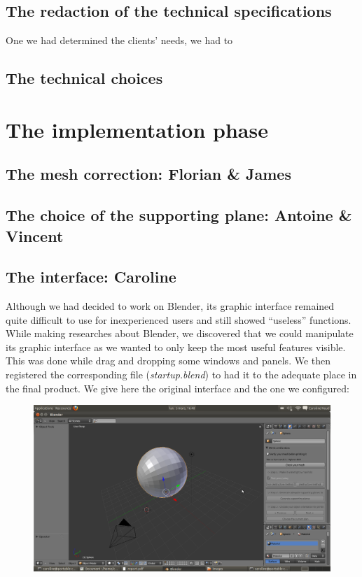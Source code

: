 \documentclass{report}
\begin{document}
\section{The redaction of the technical specifications}

One we had determined the clients' needs, we had to

\section{The technical choices}

\chapter{The implementation phase}

\section{The mesh correction: Florian \& James}

\section{The choice of the supporting plane: Antoine \& Vincent}

\section{The interface: Caroline}

Although we had decided to work on Blender, its graphic interface remained quite difficult to use for inexperienced users and still showed ``useless'' functions. \\
While making researches about Blender, we discovered that we could manipulate its graphic interface as we wanted to only keep the most useful features visible. This was done while drag 	and dropping some windows and panels. We then registered the corresponding file (\textit{startup.blend}) to had it to the adequate place in the final product. We give here the original interface and the one we configured:

\bigskip

\begin{figure}[!h]
\begin{center}
	\includegraphics[scale=0.25]{NotreInterface}
\end{center}
\end{figure}
\end{document}
